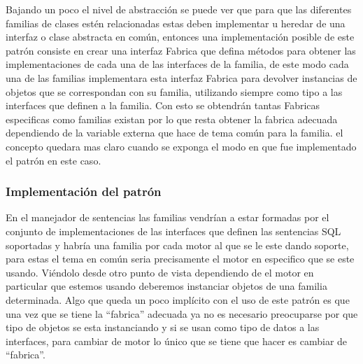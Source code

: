 Bajando un poco el nivel de abstracción se puede ver que para que las diferentes familias de clases estén relacionadas estas deben implementar u heredar de una interfaz o clase abstracta en común, entonces una implementación posible de este patrón consiste en crear una interfaz Fabrica que defina métodos para obtener las implementaciones de cada una de las interfaces de la familia, de este modo cada una de las familias implementara esta interfaz Fabrica para devolver instancias de objetos que se correspondan con su familia, utilizando siempre como tipo a las interfaces que definen a la familia. Con esto se obtendrán tantas Fabricas especificas como familias existan por lo que resta obtener la fabrica adecuada dependiendo de la variable externa que hace de tema común para la familia. el concepto quedara mas claro cuando se exponga el modo en que fue implementado el patrón en este caso.
%
\subsubsection{Implementación del patrón}
En el manejador de sentencias las familias vendrían a estar formadas por el conjunto de implementaciones de las interfaces que definen las sentencias SQL soportadas y habría una familia por cada motor al que se le este dando soporte, para estas el tema en común seria precisamente el motor en especifico que se este usando. Viéndolo desde otro punto de vista dependiendo de el motor en particular que estemos usando deberemos instanciar objetos de una familia determinada. Algo que queda un poco implícito con el uso de este patrón es que una vez que se tiene la ``fabrica'' adecuada ya no es necesario preocuparse por que tipo de objetos se esta instanciando y si se usan como tipo de datos a las interfaces, para cambiar de motor lo único que se tiene que hacer es cambiar de ``fabrica''.

